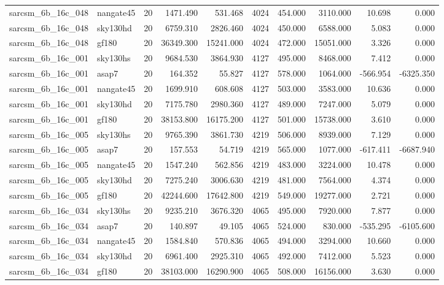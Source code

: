 \begin{tabular}{llrrrrrrrr}
sarcsm\_6b\_16c\_048 & nangate45 & 20 & 1471.490 & 531.468 & 4024 & 454.000 & 3110.000 & 10.698 & 0.000 \\
sarcsm\_6b\_16c\_048 & sky130hd & 20 & 6759.310 & 2826.460 & 4024 & 450.000 & 6588.000 & 5.083 & 0.000 \\
sarcsm\_6b\_16c\_048 & gf180 & 20 & 36349.300 & 15241.000 & 4024 & 472.000 & 15051.000 & 3.326 & 0.000 \\
sarcsm\_6b\_16c\_001 & sky130hs & 20 & 9684.530 & 3864.930 & 4127 & 495.000 & 8468.000 & 7.412 & 0.000 \\
sarcsm\_6b\_16c\_001 & asap7 & 20 & 164.352 & 55.827 & 4127 & 578.000 & 1064.000 & -566.954 & -6325.350 \\
sarcsm\_6b\_16c\_001 & nangate45 & 20 & 1699.910 & 608.608 & 4127 & 503.000 & 3583.000 & 10.636 & 0.000 \\
sarcsm\_6b\_16c\_001 & sky130hd & 20 & 7175.780 & 2980.360 & 4127 & 489.000 & 7247.000 & 5.079 & 0.000 \\
sarcsm\_6b\_16c\_001 & gf180 & 20 & 38153.800 & 16175.200 & 4127 & 501.000 & 15738.000 & 3.610 & 0.000 \\
sarcsm\_6b\_16c\_005 & sky130hs & 20 & 9765.390 & 3861.730 & 4219 & 506.000 & 8939.000 & 7.129 & 0.000 \\
sarcsm\_6b\_16c\_005 & asap7 & 20 & 157.553 & 54.719 & 4219 & 565.000 & 1077.000 & -617.411 & -6687.940 \\
sarcsm\_6b\_16c\_005 & nangate45 & 20 & 1547.240 & 562.856 & 4219 & 483.000 & 3224.000 & 10.478 & 0.000 \\
sarcsm\_6b\_16c\_005 & sky130hd & 20 & 7275.240 & 3006.630 & 4219 & 481.000 & 7564.000 & 4.374 & 0.000 \\
sarcsm\_6b\_16c\_005 & gf180 & 20 & 42244.600 & 17642.800 & 4219 & 549.000 & 19277.000 & 2.721 & 0.000 \\
sarcsm\_6b\_16c\_034 & sky130hs & 20 & 9235.210 & 3676.320 & 4065 & 495.000 & 7920.000 & 7.877 & 0.000 \\
sarcsm\_6b\_16c\_034 & asap7 & 20 & 140.897 & 49.105 & 4065 & 524.000 & 830.000 & -535.295 & -6105.600 \\
sarcsm\_6b\_16c\_034 & nangate45 & 20 & 1584.840 & 570.836 & 4065 & 494.000 & 3294.000 & 10.660 & 0.000 \\
sarcsm\_6b\_16c\_034 & sky130hd & 20 & 6961.400 & 2925.310 & 4065 & 492.000 & 7412.000 & 5.523 & 0.000 \\
sarcsm\_6b\_16c\_034 & gf180 & 20 & 38103.000 & 16290.900 & 4065 & 508.000 & 16156.000 & 3.630 & 0.000 \\

\end{tabular}
